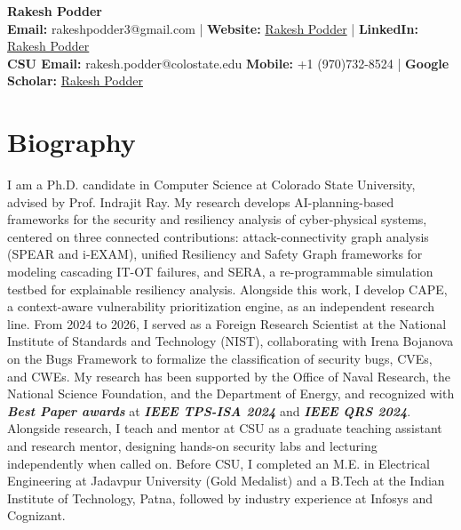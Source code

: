 \documentclass[11pt, a4paper]{article}
\begin{document}
\begin{center}
  {\fontsize{17.16}{21}\selectfont\bfseries Rakesh Podder}\\[2pt]
  {\fontsize{9.92}{12}\selectfont
    \textbf{Email: }\textcolor{cvnavy}{rakeshpodder3@gmail.com}%
    \enspace\textcolor{cvgray}{|}\enspace
    \textbf{Website: }\textcolor{cvnavy}{\href{https://cryptoknight13.github.io/rpodder/}{Rakesh Podder}}
    \enspace\textcolor{cvgray}{|}\enspace
    \textbf{LinkedIn: }\textcolor{cvnavy}{\href{https://www.linkedin.com/in/rakesh-podder-09181b7b/}{Rakesh Podder}} \\
    \textbf{CSU Email: }\textcolor{cvnavy}{rakesh.podder@colostate.edu}
    \textbf{Mobile: }\textcolor{cvnavy}{+1 (970)732-8524}
    \enspace\textcolor{cvgray}{|}\enspace
    \textbf{Google Scholar: }\textcolor{cvnavy}{\href{https://scholar.google.com/citations?user=LznkBwUAAAAJ&hl=en}{Rakesh Podder}}%
  }
\end{center}
\vspace{5pt}

\section{Biography}

{\fontsize{10.87}{13.5}\selectfont
I am a Ph.D. candidate in Computer Science at Colorado State University, advised by Prof. Indrajit Ray. My research develops AI-planning-based frameworks for the security and resiliency analysis of cyber-physical systems, centered on three connected contributions: attack-connectivity graph analysis (SPEAR and i-EXAM), unified Resiliency and Safety Graph frameworks for modeling cascading IT-OT failures, and SERA, a re-programmable simulation testbed for explainable resiliency analysis. Alongside this work, I develop CAPE, a context-aware vulnerability prioritization engine, as an independent research line. From 2024 to 2026, I served as a Foreign Research Scientist at the National Institute of Standards and Technology (NIST), collaborating with Irena Bojanova on the Bugs Framework to formalize the classification of security bugs, CVEs, and CWEs. My research has been supported by the Office of Naval Research, the National Science Foundation, and the Department of Energy, and recognized with \textbf{\textit{Best Paper awards}} at \textbf{\textit{IEEE TPS-ISA 2024}} and \textbf{\textit{IEEE QRS 2024}}. Alongside research, I teach and mentor at CSU as a graduate teaching assistant and research mentor, designing hands-on security labs and lecturing independently when called on. Before CSU, I completed an M.E. in Electrical Engineering at Jadavpur University (Gold Medalist) and a B.Tech at the Indian Institute of Technology, Patna, followed by industry experience at Infosys and Cognizant.}
\end{document}

